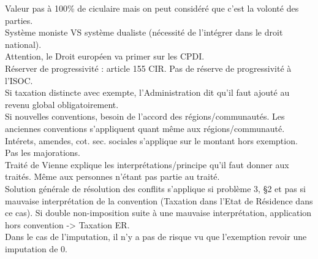 \documentclass{book}
\begin{document}
Valeur pas à 100\% de ciculaire mais on peut considéré que c'est la volonté des parties.\\

Système moniste VS système dualiste (nécessité de l'intégrer dans le droit national).\\

Attention, le Droit européen va primer sur les CPDI.\\

Réserver de progressivité : article 155 CIR. Pas de réserve de progressivité à l'ISOC.\\

Si taxation distincte avec exempte, l'Administration dit qu'il faut ajouté au revenu global obligatoirement.\\

Si nouvelles conventions, besoin de l'accord des régions/communautés. Les anciennes conventions s'appliquent quant même aux régions/communauté.\\

Intérets, amendes, cot. sec. sociales s'applique sur le montant hors exemption. Pas les majorations.\\

Traité de Vienne explique les interprétations/principe qu'il faut donner aux traités. Même aux personnes n'étant pas partie au traité.\\

Solution générale de résolution des conflits s'applique si problème 3, §2 et pas si mauvaise interprétation de la convention (Taxation dans l'Etat de Résidence dans ce cas). Si double non-imposition suite à une mauvaise interprétation, application hors convention -> Taxation ER.\\

Dans le cas de l'imputation, il n'y a pas de risque vu que l'exemption revoir une imputation de 0.









\nocite{*}

\end{document}
